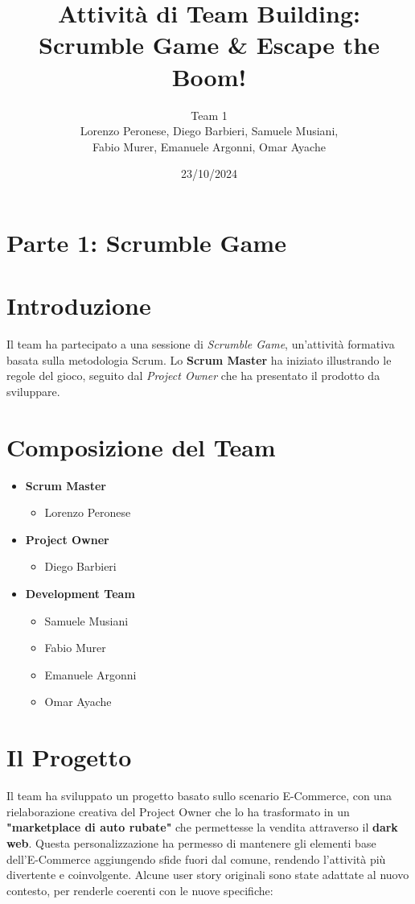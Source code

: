 \documentclass{article}
\title{\textbf{Attività di Team Building:\\Scrumble Game \& Escape the Boom!}}
\author{Team 1\\
Lorenzo Peronese, Diego Barbieri, Samuele Musiani,\\
Fabio Murer, Emanuele Argonni, Omar Ayache}
\date{23/10/2024}
\begin{document}
\maketitle

\section*{Parte 1: Scrumble Game}

\section*{Introduzione}
Il team ha partecipato a una sessione di \textit{Scrumble Game}, un'attività formativa basata sulla metodologia Scrum. Lo \textbf{Scrum Master} ha iniziato illustrando le regole del gioco, seguito dal \textit{Project Owner} che ha presentato il prodotto da sviluppare.

\section*{Composizione del Team}
\begin{itemize}
    \item \textbf{Scrum Master}
    \begin{itemize}
        \item Lorenzo Peronese
    \end{itemize}
    \item \textbf{Project Owner}
    \begin{itemize}
        \item Diego Barbieri
    \end{itemize}
    \item \textbf{Development Team}
    \begin{itemize}
        \item Samuele Musiani
        \item Fabio Murer
        \item Emanuele Argonni
        \item Omar Ayache
    \end{itemize}
\end{itemize}

\section*{Il Progetto}
Il team ha sviluppato un progetto basato sullo scenario E-Commerce, con una rielaborazione creativa del Project Owner che lo ha trasformato in un \textbf{"marketplace di auto rubate"} che permettesse la vendita attraverso il \textbf{dark web}. Questa personalizzazione ha permesso di mantenere gli elementi base dell'E-Commerce aggiungendo sfide fuori dal comune, rendendo l'attività più divertente e coinvolgente. Alcune user story originali sono state adattate al nuovo contesto, per renderle coerenti con le nuove specifiche:
\end{document}
